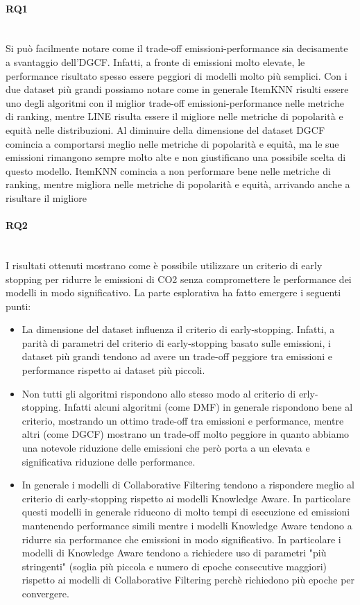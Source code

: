 \paragraph*{RQ1} \textcolor{white}{.}\\
Si può facilmente notare come il trade-off emissioni-performance sia decisamente a svantaggio dell'DGCF. Infatti, a fronte di emissioni molto elevate, le performance risultato spesso essere peggiori di modelli molto più semplici.
Con i due dataset più grandi possiamo notare come in generale ItemKNN risulti essere uno degli algoritmi con il miglior trade-off emissioni-performance nelle metriche di ranking, mentre LINE risulta essere il migliore nelle metriche di popolarità e equità nelle distribuzioni.
Al diminuire della dimensione del dataset DGCF comincia a comportarsi meglio nelle metriche di popolarità e equità, ma le sue emissioni rimangono sempre molto alte e non giustificano una possibile scelta di questo modello.
ItemKNN comincia a non performare bene nelle metriche di ranking, mentre migliora nelle metriche di popolarità e equità, arrivando anche a risultare il migliore

\paragraph*{RQ2} \textcolor{white}{.}\\
I risultati ottenuti mostrano come è possibile utilizzare un criterio di early stopping per ridurre le emissioni di CO2 senza compromettere le performance dei modelli in modo significativo. La parte esplorativa ha fatto emergere i seguenti punti:
\begin{itemize}
    \item La dimensione del dataset influenza il criterio di early-stopping. Infatti, a parità di parametri del criterio di early-stopping basato sulle emissioni, i dataset più grandi tendono ad avere un trade-off peggiore tra emissioni e performance rispetto ai dataset più piccoli.
    \item Non tutti gli algoritmi rispondono allo stesso modo al criterio di erly-stopping. Infatti alcuni algoritmi (come DMF) in generale rispondono bene al criterio, mostrando un ottimo trade-off tra emissioni e performance, mentre altri (come DGCF) mostrano un trade-off molto peggiore in quanto abbiamo una notevole riduzione delle emissioni che però porta a un elevata e significativa riduzione delle performance.
    \item In generale i modelli di Collaborative Filtering tendono a rispondere meglio al criterio di early-stopping rispetto ai modelli Knowledge Aware. In particolare questi modelli in generale riducono di molto tempi di esecuzione ed emissioni mantenendo performance simili mentre i modelli Knowledge Aware tendono a ridurre sia performance che emissioni in modo significativo. In particolare i modelli di Knowledge Aware tendono a richiedere uso di parametri "più stringenti" (soglia più piccola e numero di epoche consecutive maggiori) rispetto ai modelli di Collaborative Filtering perchè richiedono più epoche per convergere.
\end{itemize}

